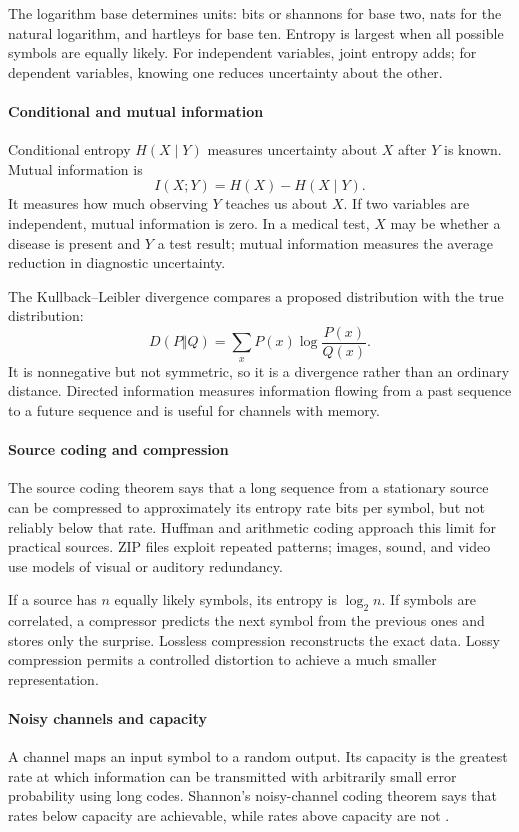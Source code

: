 The logarithm base determines units: bits or shannons for base two, nats for the natural logarithm, and hartleys for base ten. Entropy is largest when all possible symbols are equally likely. For independent variables, joint entropy adds; for dependent variables, knowing one reduces uncertainty about the other.

\paragraph{Conditional and mutual information}
Conditional entropy $H(X\mid Y)$ measures uncertainty about $X$ after $Y$ is known. Mutual information is
\[
I(X;Y)=H(X)-H(X\mid Y).
\]
It measures how much observing $Y$ teaches us about $X$. If two variables are independent, mutual information is zero. In a medical test, $X$ may be whether a disease is present and $Y$ a test result; mutual information measures the average reduction in diagnostic uncertainty.

The Kullback--Leibler divergence compares a proposed distribution with the true distribution:
\[
D(P\Vert Q)=\sum_xP(x)\log\frac{P(x)}{Q(x)}.
\]
It is nonnegative but not symmetric, so it is a divergence rather than an ordinary distance. Directed information measures information flowing from a past sequence to a future sequence and is useful for channels with memory.

\paragraph{Source coding and compression}
The source coding theorem says that a long sequence from a stationary source can be compressed to approximately its entropy rate bits per symbol, but not reliably below that rate. Huffman and arithmetic coding approach this limit for practical sources. ZIP files exploit repeated patterns; images, sound, and video use models of visual or auditory redundancy.

If a source has $n$ equally likely symbols, its entropy is $\log_2n$. If symbols are correlated, a compressor predicts the next symbol from the previous ones and stores only the surprise. Lossless compression reconstructs the exact data. Lossy compression permits a controlled distortion to achieve a much smaller representation.

\paragraph{Noisy channels and capacity}
A channel maps an input symbol to a random output. Its capacity is the greatest rate at which information can be transmitted with arbitrarily small error probability using long codes. Shannon's noisy-channel coding theorem says that rates below capacity are achievable, while rates above capacity are not \cite{information_theory_ref2}.

